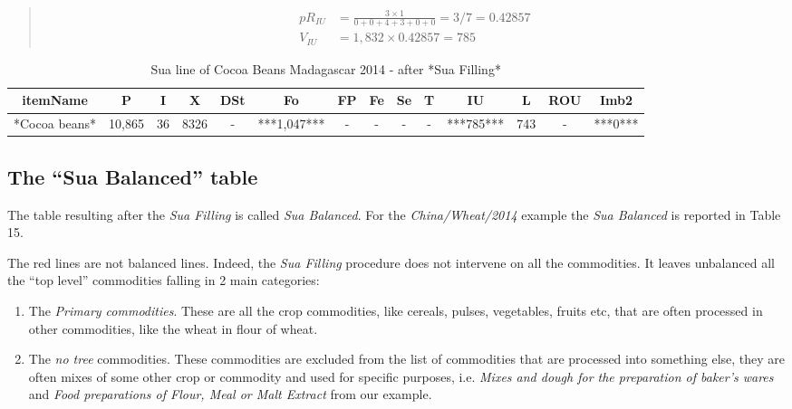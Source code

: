 \documentclass[]{article}
\providecommand{\tightlist}{%
  \setlength{\itemsep}{0pt}\setlength{\parskip}{0pt}}
\begin{document}
\begin{quote}
\end{quote}

\begin{quote}
\begin{equation}
\begin{aligned}
\label{eq:VIUC}
pR_{IU} &= \frac{3\times 1}{0 + 0 + 4 + 3 + 0 + 0} = 3/7 = 0.42857\\
V_{IU} &= 1,832 \times 0.42857 = 785
\end{aligned}
\end{equation}
\end{quote}

\begin{table}

\caption{\label{tab:t13}Sua line of Cocoa Beans Madagascar 2014 - after *Sua Filling*}
\centering
\begin{tabular}[t]{c|c|c|c|c|c|c|c|c|c|c|c|c|c}
\hline
itemName & P & I & X & DSt & Fo & FP & Fe & Se & T & IU & L & ROU & Imb2\\
\hline
*Cocoa beans* & 10,865 & 36 & 8326 & - & ***1,047*** & - & - & - & - & ***785*** & 743 & - & ***0***\\
\hline
\end{tabular}
\end{table}

\subsection*{\texorpdfstring{The ``Sua Balanced''
table}{The Sua Balanced table}}\label{the-sua-balanced-table}

The table resulting after the \emph{Sua Filling} is called \emph{Sua
Balanced}. For the \emph{China/Wheat/2014} example the \emph{Sua
Balanced} is reported in Table 15.

The red lines are not balanced lines. Indeed, the \emph{Sua Filling}
procedure does not intervene on all the commodities. It leaves
unbalanced all the ``top level'' commodities falling in 2 main
categories:

\begin{enumerate}
\def\labelenumi{\arabic{enumi}.}
\tightlist
\item
  The \emph{Primary commodities}. These are all the crop commodities,
  like cereals, pulses, vegetables, fruits etc, that are often processed
  in other commodities, like the wheat in flour of wheat.
\item
  The \emph{no tree} commodities. These commodities are excluded from
  the list of commodities that are processed into something else, they
  are often mixes of some other crop or commodity and used for specific
  purposes, i.e. \emph{Mixes and dough for the preparation of baker's
  wares} and \emph{Food preparations of Flour, Meal or Malt Extract}
  from our example.
\end{enumerate}
\end{document}
